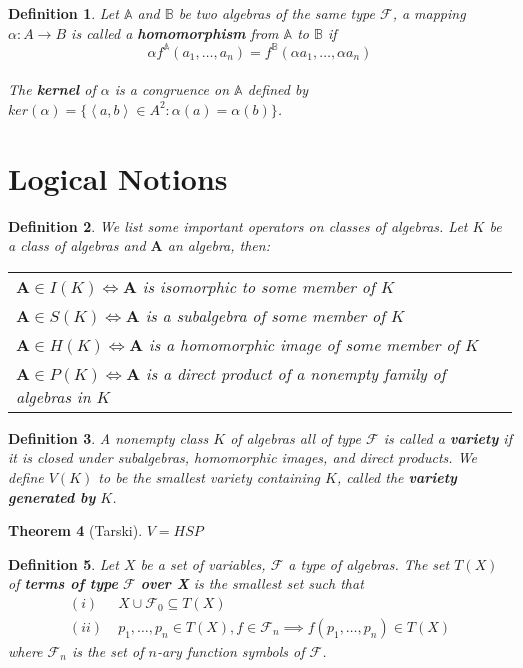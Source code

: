 \documentclass[12pt,a4paper]{article}
\newtheorem{theorem}{Theorem}[section]
\newtheorem{definition}[theorem]{Definition}
\newcommand\FF{\mathcal{F}}
\begin{document}
\begin{definition}
Let $\mathbb{A}$ and $\mathbb{B}$ be two algebras of the same type $\mathcal{F}$, a mapping $\alpha:A\to B$ is called a \textbf{homomorphism} from $\mathbb{A}$ to $\mathbb{B}$ if 
\[
\alpha f^\mathbb{A}(a_1,\ldots,a_n)=f^\mathbb{B}(\alpha a_1,\ldots,\alpha a_n)
\]\\
The \textbf{kernel} of $\alpha$ is a congruence on $\mathbb{A}$ defined by $ker(\alpha)=\{ \left<a,b\right> \in A^2:\alpha(a)=\alpha(b)\}$.\\
\end{definition}

\section{Logical Notions}

\begin{definition}
    We list some important operators on classes of algebras. Let $K$ be a class of algebras and $\mathbf{A}$ an algebra, then:\\
    \begin{tabular}{l}
        $\mathbf{A}\in I(K)\iff\mathbf{A}$ is isomorphic to some member of $K$ \\
        $\mathbf{A}\in S(K)\iff\mathbf{A}$ is a subalgebra of some member of $K$\\
        $\mathbf{A}\in H(K)\iff\mathbf{A}$ is a homomorphic image of some member of $K$\\
        $\mathbf{A}\in P(K)\iff\mathbf{A}$ is a direct product of a nonempty family of algebras in $K$
    \end{tabular}
\end{definition}

\begin{definition}
    A nonempty class $K$ of algebras all of type $\FF$ is called a \textbf{variety} if it is closed under subalgebras, homomorphic images, and direct products.
    We define $V(K)$ to be the smallest variety containing $K$, called the \textbf{variety generated by } $K$.
\end{definition}

\begin{theorem}[Tarski]
    $V=HSP$
\end{theorem}

\begin{definition}
Let $X$ be a set of variables, $\FF$ a type of algebras.
The set $T(X)$ of \textbf{terms of type} $\FF$ \textbf{over X} is the smallest set such that
\begin{align*}
    (i)\; & X\cup \FF_0\subseteq T(X)\\
    (ii) \;& p_1,\ldots,p_n\in T(X), f\in\FF_n\implies f(p_1,\ldots,p_n)\in T(X)
\end{align*}
where $\FF_n$ is the set of $n$-ary function symbols of $\FF$.
\end{definition}
\end{document}
